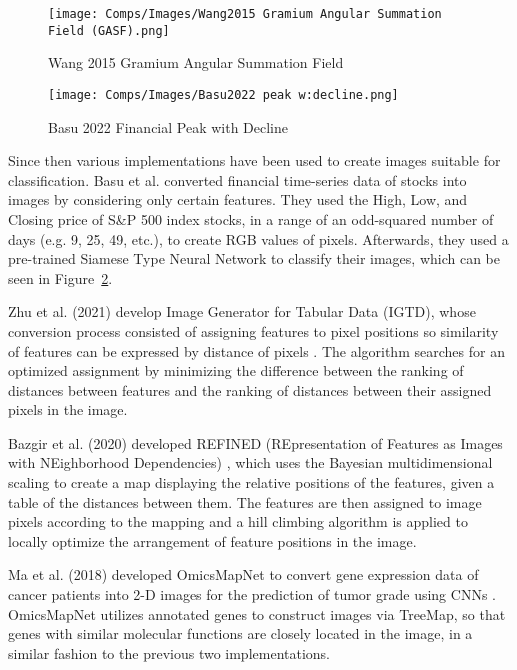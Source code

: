 \documentclass[10pt,twocolumn]{article}
\begin{document}

\begin{figure}[ht]
    \centering
    \texttt{[image: Comps/Images/Wang2015 Gramium Angular Summation Field (GASF).png]}
    \caption{Wang 2015 Gramium Angular Summation Field}
    \label{Wang2015GASF}
\end{figure}

\begin{figure}[ht]
    \centering
    \texttt{[image: Comps/Images/Basu2022 peak w:decline.png]}
    \caption{Basu 2022 Financial Peak with Decline}
    \label{Basu2022FPwD}
\end{figure}

Since then various implementations have been used to create images suitable for classification.
Basu et al. \cite{Basu2022} converted financial time-series data of stocks into images by considering only certain features.
They used the High, Low, and Closing price of S\&P 500 index stocks, in a range of an odd-squared number of days (e.g. 9, 25, 49, etc.), to create RGB values of pixels.
Afterwards, they used a pre-trained Siamese Type Neural Network to classify their images, which can be seen in Figure~\ref{Basu2022FPwD}.

Zhu et al. (2021) develop Image Generator for Tabular Data (IGTD), whose conversion process consisted of assigning features to pixel positions so similarity of features can be expressed by distance of pixels \cite{Zhu2021}. The algorithm searches for an optimized assignment by minimizing the difference between the ranking of distances between features and the ranking of distances between their assigned pixels in the image.

Bazgir et al. (2020) developed REFINED (REpresentation of Features as Images with NEighborhood Dependencies) \cite{Bazgir2020}, which uses the Bayesian multidimensional scaling to create a map displaying the relative positions of the features, given a table of the distances between them. The features are then assigned to image pixels according to the mapping and a hill climbing algorithm is applied to locally optimize the arrangement of feature positions in the image.

Ma et al. (2018) developed OmicsMapNet to convert gene expression data of cancer patients into 2-D images for the prediction of tumor grade using CNNs \cite{Ma2018}. OmicsMapNet utilizes annotated genes to construct images via TreeMap, so that genes with similar molecular functions are closely located in the image, in a similar fashion to the previous two implementations.
\end{document}
